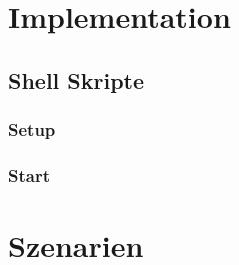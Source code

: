\documentclass{article}
\begin{document}
\section{Implementation}

\subsection{Shell Skripte}
\subsubsection{Setup}
\subsubsection{Start}
\section{Szenarien}
\end{document}
